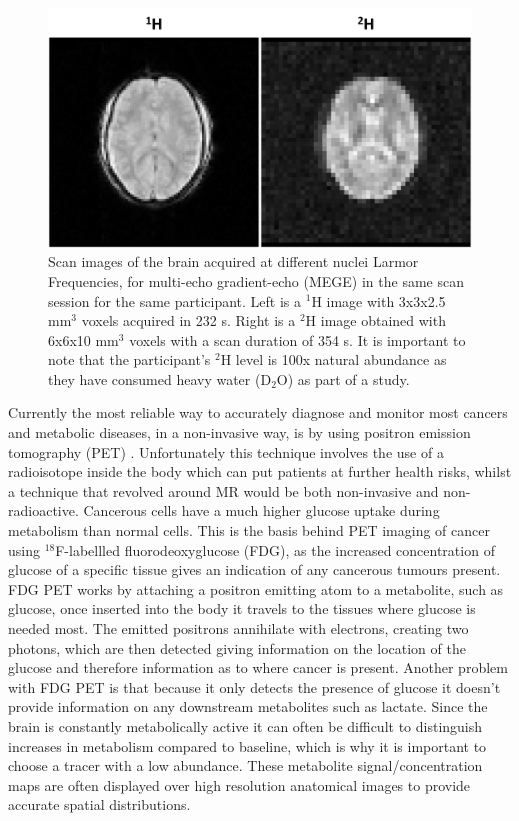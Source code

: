 \documentclass[class=article, crop=false]{standalone}
\begin{document}
\begin{figure}
    \centering
    \includegraphics[width=1\textwidth]{Figures/Intro/1H2H_Brain.png}
    \caption{Scan images of the brain acquired at different nuclei Larmor Frequencies, for multi-echo gradient-echo (MEGE) in the same scan session for the same participant. Left is a $^1$H image with 3x3x2.5 mm$^3$ voxels acquired in 232 s. Right is a $^2$H image obtained with 6x6x10 mm$^3$ voxels with a scan duration of 354 s. It is important to note that the participant's $^2$H level is 100x natural abundance as they have consumed heavy water (D$_2$O) as part of a study.}
    \label{fig:intro:1H2H_Brain}
\end{figure}

Currently the most reliable way to accurately diagnose and monitor most cancers and metabolic diseases, in a non-invasive way, is by using positron emission tomography (PET) \cite{Almuhaideb201118F-FDGOncology}. Unfortunately this technique involves the use of a radioisotope inside the body which can put patients at further health risks, whilst a technique that revolved around MR would be both non-invasive and non-radioactive. Cancerous cells have a much higher glucose uptake during metabolism than normal cells. This is the basis behind PET imaging of cancer using $^{18}$F-labellled fluorodeoxyglucose (FDG), as the increased concentration of glucose of a specific tissue gives an indication of any cancerous tumours present. FDG PET works by attaching a positron emitting atom to a metabolite, such as glucose, once inserted into the body it travels to the tissues where glucose is needed most. The emitted positrons annihilate with electrons, creating two photons, which are then detected giving information on the location of the glucose and therefore information as to where cancer is present. Another problem with FDG PET is that because it only detects the presence of glucose it doesn't provide information on any downstream metabolites such as lactate. Since the brain is constantly metabolically active it can often be difficult to distinguish increases in metabolism compared to baseline, which is why it is important to choose a tracer with a low abundance. These metabolite signal/concentration maps are often displayed over high resolution anatomical images to provide accurate spatial distributions.
\end{document}
